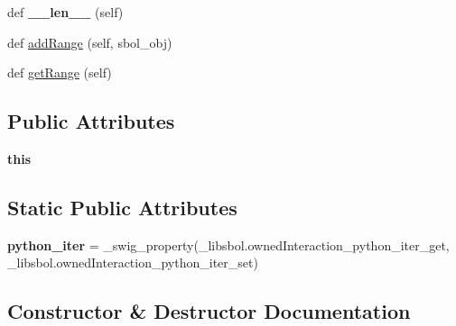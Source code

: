 \begin{DoxyCompactItemize}
\item 
def {\bfseries \+\_\+\+\_\+len\+\_\+\+\_\+} (self)\hypertarget{classsbol_1_1libsbol_1_1owned_interaction_a7a4e2fbbe8ab6c03fbcb9921e1f9402d}{}\label{classsbol_1_1libsbol_1_1owned_interaction_a7a4e2fbbe8ab6c03fbcb9921e1f9402d}

\item 
def \hyperlink{classsbol_1_1libsbol_1_1owned_interaction_a3250116cf795d573c83a5956d31d8a59}{add\+Range} (self, sbol\+\_\+obj)
\item 
def \hyperlink{classsbol_1_1libsbol_1_1owned_interaction_abeada70e3da6803590d55dc56bc94c08}{get\+Range} (self)
\end{DoxyCompactItemize}
\subsection*{Public Attributes}
\begin{DoxyCompactItemize}
\item 
{\bfseries this}\hypertarget{classsbol_1_1libsbol_1_1owned_interaction_a3ecf78fdddfb4adbc5f1acef7f5c2f20}{}\label{classsbol_1_1libsbol_1_1owned_interaction_a3ecf78fdddfb4adbc5f1acef7f5c2f20}

\end{DoxyCompactItemize}
\subsection*{Static Public Attributes}
\begin{DoxyCompactItemize}
\item 
{\bfseries python\+\_\+iter} = \+\_\+swig\+\_\+property(\+\_\+libsbol.\+owned\+Interaction\+\_\+python\+\_\+iter\+\_\+get, \+\_\+libsbol.\+owned\+Interaction\+\_\+python\+\_\+iter\+\_\+set)\hypertarget{classsbol_1_1libsbol_1_1owned_interaction_aa9b5f37c6567bb07861148ba62fc3a06}{}\label{classsbol_1_1libsbol_1_1owned_interaction_aa9b5f37c6567bb07861148ba62fc3a06}

\end{DoxyCompactItemize}


\subsection{Constructor \& Destructor Documentation}
